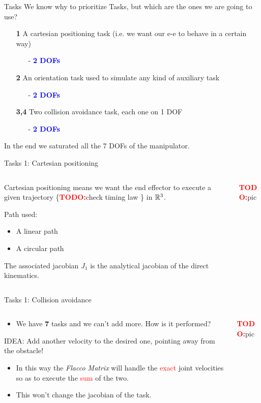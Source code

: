 \documentclass[11pt]{beamer}
\newcommand{\todo}{\textcolor{red}{\textbf{TODO:}}}
\newcommand{\dof}[1]{\begin{itemize}
\item[-]\textcolor{blue}{\textbf{#1 DOFs}}
\end{itemize}}
\begin{document}
\begin{frame}{Tasks}
We know why to prioritize Tasks, but which are the ones we are going to use?
\begin{itemize}
\item[\textbf{1}] A cartesian positioning task (i.e. we want our e-e to behave in a certain way)
\dof{2}
\item[\textbf{2}] An orientation task used to simulate any kind of auxiliary task
\dof{2}
\item[\textbf{3,4}] Two collision avoidance task, each one on 1 DOF
\dof{2}
\end{itemize}
In the end we saturated all the 7 DOFs of the manipulator.
\end{frame}

\begin{frame}{Tasks 1: Cartesian positioning}
\begin{columns}
\begin{column}{.5\textwidth}
Cartesian positioning means we want the end effector to execute a given trajectory \{\todo check timing law \} in $\Bbb R^3$.

\begin{block}{Path used:}
\begin{itemize}
\item A linear path
\item A circular path 
\end{itemize}
\end{block}

The associated jacobian $J_1$ is the analytical jacobian of the direct kinematics.
\end{column}
\begin{column}{.5\textwidth}
\todo pic
\end{column}
\end{columns}
\end{frame}

\begin{frame}{Tasks 1: Collision avoidance}
\begin{columns}
\begin{column}{.5\textwidth}
\begin{itemize}
\item We have \textbf{7} tasks and we can't add more. How is it performed?
\end{itemize}
\begin{block}{IDEA:}
Add another velocity to the desired one, pointing away from the obstacle! 
\end{block}
\begin{itemize}
\item In this way the \emph{Flacco Matrix} will handle the \textcolor{red}{exact} joint velocities so as to execute the \textcolor{red}{sum} of the two.
\item This won't change the jacobian of the task.
\end{itemize}
\end{column}
\begin{column}{.5\textwidth}
\todo pic
\end{column}
\end{columns}
\end{frame}
\end{document}
